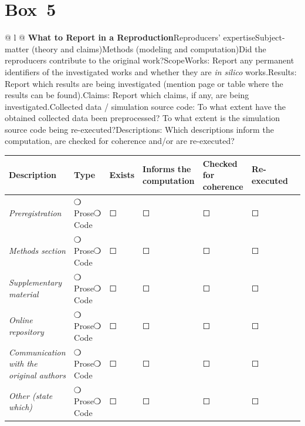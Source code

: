 \documentclass[authordate, empirical]{jote-new-article}
\begin{document}
	\section{\textbf{Box 5}}

	\begin{table}
		\begin{tabularx}{\linewidth}{@{} l @{}}
			\hline \textbf{What to Report in a Reproduction}Reproducers’ expertiseSubject-matter (theory and claims)Methods (modeling and computation)Did the reproducers contribute to the original work?ScopeWorks: Report any permanent identifiers of the investigated works and whether they are \emph{in silico} works.Results: Report which results are being investigated (mention page or table where the results can be found).Claims: Report which claims, if any, are being investigated.Collected data / simulation source code: To what extent have the obtained collected data been preprocessed? To what extent is the simulation source code being re-executed?Descriptions: Which descriptions inform the computation, are checked for coherence and/or are re-executed?
			\begin{table}
				\begin{tabularx}{\linewidth}{@{} l l l l l l l @{}}
					\hline \textbf{Description} & \textbf{Type} & \textbf{Exists} & \textbf{Informs the computation}
					& \textbf{Checked for coherence} & \textbf{Re-executed} \\

					\hline \emph{Preregistration} & ❍ Prose❍ Code & ☐ & ☐ & ☐ & ☐ \\

					\hline \emph{Methods section} & ❍ Prose❍ Code & ☐ & ☐ & ☐ & ☐ \\

					\hline \emph{Supplementary material} & ❍ Prose❍ Code & ☐ & ☐ & ☐ & ☐ \\

					\hline \emph{Online repository} & ❍ Prose❍ Code & ☐ & ☐ & ☐ & ☐ \\

					\hline \emph{Communication with the original authors} & ❍ Prose❍ Code &
					☐ & ☐ & ☐ & ☐ \\

					\hline \emph{Other (state which)} & ❍ Prose❍ Code & ☐ & ☐ & ☐ & ☐ \\


				\end{tabularx}
			\end{table}


\end{tabularx}
\end{table}
\end{document}
